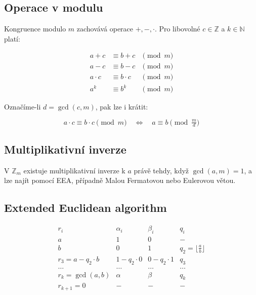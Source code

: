 \documentclass[a4paper]{article}
\newcommand{\Z}{\mathbb{Z}}
\newcommand{\N}{\mathbb{N}}
\begin{document}
\subsection{Operace v modulu}

Kongruence modulo $m$ zachovává operace $+,-,\cdot$. Pro libovolné $c \in \Z$ a $k \in \N$ platí:

\[
    \begin{array}{rll}
        a + c     & \equiv b + c     & \pmod m \\
        a - c     & \equiv b - c     & \pmod m \\
        a \cdot c & \equiv b \cdot c & \pmod m \\
        a^k       & \equiv b^k       & \pmod m
    \end{array}
\]

Označíme-li $d = \gcd(c, m)$, pak lze i krátit:

\[
    a \cdot c \equiv b \cdot c \pmod m
    \quad\Leftrightarrow\quad
    a \equiv b \pmod{\tfrac{m}{d}}
\]

\subsection{Multiplikativní inverze}

V $\Z_m$ existuje multiplikativní inverze k $a$ právě tehdy, když $\gcd(a,m)=1$, a lze najít pomocí EEA, případně Malou Fermatovou nebo Eulerovou větou.

\subsection{Extended Euclidean algorithm}

\[
    \begin{array}{c|cc|c}
        r_i              & \alpha_i    & \beta_i     & q_i                            \\[1.5mm] \hline
        a                & 1           & 0           & -                              \\[1.5mm]
        b                & 0           & 1           & q_2=\lfloor\tfrac{a}{b}\rfloor \\[1.5mm] \hline
        r_3=a-q_2\cdot b & 1-q_2\cdot0 & 0-q_2\cdot1 & q_3                            \\[1.5mm]
        \dots            & \dots       & \dots       & \dots                          \\[1.5mm]
        r_k=\gcd(a,b)    & \alpha      & \beta       & q_k                            \\[1.5mm]
        r_{k+1}=0        & -           & -           & -                              \\[1.5mm]
    \end{array}
\]
\end{document}
